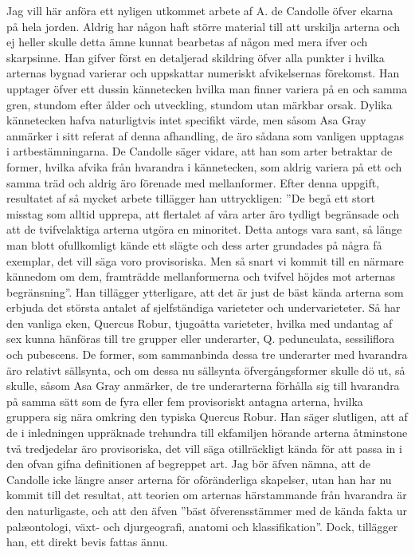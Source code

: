 Jag vill här anföra ett nyligen utkommet arbete af A. de Candolle öfver ekarna på hela jorden. Aldrig har någon haft större material till att urskilja arterna och ej heller skulle detta ämne kunnat bearbetas af någon med mera ifver och skarpsinne. Han gifver först en detaljerad skildring öfver alla punkter i hvilka arternas bygnad varierar och uppskattar numeriskt afvikelsernas förekomst. Han upptager öfver ett dussin kännetecken hvilka man finner variera på en och samma gren, stundom efter ålder och utveckling, stundom utan märkbar orsak. Dylika kännetecken hafva naturligtvis intet specifikt värde, men såsom Asa Gray anmärker i sitt referat af denna afhandling, de äro sådana som vanligen upptagas i artbestämningarna. De Candolle säger vidare, att han som arter betraktar de former, hvilka afvika från hvarandra i kännetecken, som aldrig variera på ett och samma träd och aldrig äro förenade med mellanformer. Efter denna uppgift, resultatet af så mycket arbete tillägger han uttryckligen: ”De begå ett stort misstag som alltid upprepa, att flertalet af våra arter äro tydligt begränsade och att de tvifvelaktiga arterna utgöra en minoritet. Detta antogs vara sant, så länge man blott ofullkomligt kände ett slägte och dess arter grundades på några få exemplar, det vill säga voro provisoriska. Men så snart vi kommit till en närmare kännedom om dem, framträdde mellanformerna och tvifvel höjdes mot arternas begränsning”. Han tillägger ytterligare, att det är just de bäst kända arterna som erbjuda det största antalet af sjelfständiga varieteter och undervarieteter. Så har den vanliga eken, Quercus Robur, tjugoåtta varieteter, hvilka med undantag af sex kunna hänföras till tre grupper eller underarter, Q. pedunculata, sessiliflora och pubescens. De former, som sammanbinda dessa tre underarter med hvarandra äro relativt sällsynta, och om dessa nu sällsynta öfvergångsformer skulle dö ut, så skulle, såsom Asa Gray anmärker, de tre underarterna förhålla sig till hvarandra på samma sätt som de fyra eller fem provisoriskt antagna arterna, hvilka gruppera sig nära omkring den typiska Quercus Robur. Han säger slutligen, att af de i inledningen uppräknade trehundra till ekfamiljen hörande arterna åtminstone två tredjedelar äro provisoriska, det vill säga otillräckligt kända för att passa in i den ofvan gifna definitionen af begreppet art. Jag bör äfven nämna, att de Candolle icke längre anser arterna för oföränderliga skapelser, utan han har nu kommit till det resultat, att teorien om arternas härstammande från hvarandra är den naturligaste, och att den äfven ”bäst öfverensstämmer med de kända fakta ur palæontologi, växt- och djurgeografi, anatomi och klassifikation”. Dock, tillägger han, ett direkt bevis fattas ännu.

